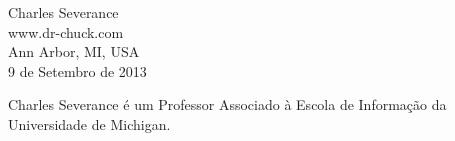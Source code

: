 Charles Severance\\
www.dr-chuck.com\\
Ann Arbor, MI, USA\\
9 de Setembro de 2013


Charles Severance é um Professor Associado à Escola de Informação da
Universidade de Michigan.



